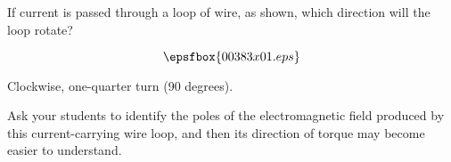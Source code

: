 

If current is passed through a loop of wire, as shown, which direction will the loop rotate?

$$\epsfbox{00383x01.eps}$$







Clockwise, one-quarter turn (90 degrees).







Ask your students to identify the poles of the electromagnetic field produced by this current-carrying wire loop, and then its direction of torque may become easier to understand.




